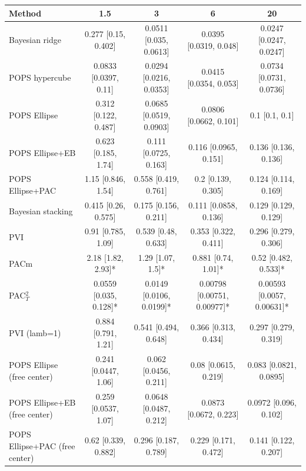 \begin{tabular}{lcccc}
\toprule
Method & 1.5 & 3 & 6 & 20 \\
\midrule
Bayesian ridge & 0.277 {\scriptsize[0.15, 0.402]} & 0.0511 {\scriptsize[0.035, 0.0613]} & 0.0395 {\scriptsize[0.0319, 0.048]} & 0.0247 {\scriptsize[0.0247, 0.0247]} \\
POPS hypercube & 0.0833 {\scriptsize[0.0397, 0.11]} & 0.0294 {\scriptsize[0.0216, 0.0353]} & 0.0415 {\scriptsize[0.0354, 0.053]} & 0.0734 {\scriptsize[0.0731, 0.0736]} \\
POPS Ellipse & 0.312 {\scriptsize[0.122, 0.487]} & 0.0685 {\scriptsize[0.0519, 0.0903]} & 0.0806 {\scriptsize[0.0662, 0.101]} & 0.1 {\scriptsize[0.1, 0.1]} \\
POPS Ellipse+EB & 0.623 {\scriptsize[0.185, 1.74]} & 0.111 {\scriptsize[0.0725, 0.163]} & 0.116 {\scriptsize[0.0965, 0.151]} & 0.136 {\scriptsize[0.136, 0.136]} \\
POPS Ellipse+PAC & 1.15 {\scriptsize[0.846, 1.54]} & 0.558 {\scriptsize[0.419, 0.761]} & 0.2 {\scriptsize[0.139, 0.305]} & 0.124 {\scriptsize[0.114, 0.169]} \\
Bayesian stacking & 0.415 {\scriptsize[0.26, 0.575]} & 0.175 {\scriptsize[0.156, 0.211]} & 0.111 {\scriptsize[0.0858, 0.136]} & 0.129 {\scriptsize[0.129, 0.129]} \\
PVI & 0.91 {\scriptsize[0.785, 1.09]} & 0.539 {\scriptsize[0.48, 0.633]} & 0.353 {\scriptsize[0.322, 0.411]} & 0.296 {\scriptsize[0.279, 0.306]} \\
PACm & 2.18 {\scriptsize[1.82, 2.93]}* & 1.29 {\scriptsize[1.07, 1.5]}* & 0.881 {\scriptsize[0.74, 1.01]}* & 0.52 {\scriptsize[0.482, 0.533]}* \\
PAC$^2_T$ & 0.0559 {\scriptsize[0.035, 0.128]}* & 0.0149 {\scriptsize[0.0106, 0.0199]}* & 0.00798 {\scriptsize[0.00751, 0.00977]}* & 0.00593 {\scriptsize[0.0057, 0.00631]}* \\
PVI (lamb=1) & 0.884 {\scriptsize[0.791, 1.21]} & 0.541 {\scriptsize[0.494, 0.648]} & 0.366 {\scriptsize[0.313, 0.434]} & 0.297 {\scriptsize[0.279, 0.319]} \\
POPS Ellipse (free center) & 0.241 {\scriptsize[0.0447, 1.06]} & 0.062 {\scriptsize[0.0456, 0.211]} & 0.08 {\scriptsize[0.0615, 0.219]} & 0.083 {\scriptsize[0.0821, 0.0895]} \\
POPS Ellipse+EB (free center) & 0.259 {\scriptsize[0.0537, 1.07]} & 0.0648 {\scriptsize[0.0487, 0.212]} & 0.0873 {\scriptsize[0.0672, 0.223]} & 0.0972 {\scriptsize[0.096, 0.102]} \\
POPS Ellipse+PAC (free center) & 0.62 {\scriptsize[0.339, 0.882]} & 0.296 {\scriptsize[0.187, 0.789]} & 0.229 {\scriptsize[0.171, 0.472]} & 0.141 {\scriptsize[0.122, 0.207]} \\
\bottomrule
\end{tabular}

